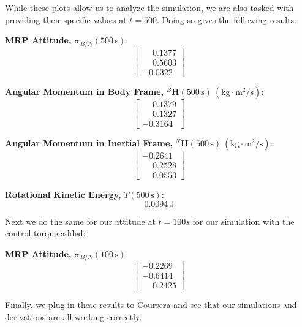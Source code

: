 \documentclass[conf]{new-aiaa}
\begin{document}
While these plots allow us to analyze the simulation, we are also tasked with providing their specific values at $t=500$. Doing so gives the following results:

\textbf{MRP Attitude,} $\bm{\sigma}_{B/N}(500\,\text{s})$:
\[
\begin{bmatrix}
\phantom{-}0.1377 \\
\phantom{-}0.5603 \\
-0.0322
\end{bmatrix}
\]

\textbf{Angular Momentum in Body Frame,} ${}^B\mathbf{H}(500\,\text{s})\ (\text{kg}\cdot\text{m}^2/\text{s})$:
\[
\begin{bmatrix}
\phantom{-}0.1379 \\
\phantom{-}0.1327 \\
-0.3164
\end{bmatrix}
\]

\textbf{Angular Momentum in Inertial Frame,} ${}^N\mathbf{H}(500\,\text{s})\ (\text{kg}\cdot\text{m}^2/\text{s})$:
\[
\begin{bmatrix}
-0.2641 \\
\phantom{-}0.2528 \\
\phantom{-}0.0553
\end{bmatrix}
\]

\textbf{Rotational Kinetic Energy,} $T(500\,\text{s})$:
\[
0.0094\ \text{J}
\]

\vspace{1em}
Next we do the same for our attitude at $t=100s$ for our simulation with the control torque added:

\textbf{MRP Attitude,} $\bm{\sigma}_{B/N}(100\,\text{s})$:
\[
\begin{bmatrix}
-0.2269 \\
-0.6414 \\
\phantom{-}0.2425
\end{bmatrix}
\]

Finally, we plug in these results to Coursera and see that our simulations and derivations are all working correctly.
\end{document}

